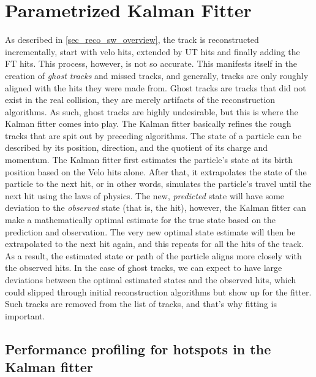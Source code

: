 \documentclass[12pt]{article}
\begin{document}
\section{Parametrized Kalman Fitter}

As described in \ref{sec_reco_sw_overview}, the track is reconstructed incrementally, start with velo hits, extended by UT hits and finally adding the FT hits. This process, however, is not so accurate. This manifests itself in the creation of \textit{ghost tracks} and missed tracks, and generally, tracks are only roughly aligned with the hits they were made from. Ghost tracks are tracks that did not exist in the real collision, they are merely artifacts of the reconstruction algorithms. As such, ghost tracks are highly undesirable, but this is where the Kalman fitter comes into play. 
The Kalman fitter basically refines the rough tracks that are spit out by preceding algorithms. The state of a particle can be described by its position, direction, and the quotient of its charge and momentum. The Kalman fitter first estimates the particle's state at its birth position based on the Velo hits alone. After that, it extrapolates the state of the particle to the next hit, or in other words, simulates the particle's travel until the next hit using the laws of physics. The new, \textit{predicted} state will have some deviation to the \textit{observed} state (that is, the hit), however, the Kalman fitter can make a mathematically optimal estimate for the true state based on the prediction and observation. The very new optimal state estimate will then be extrapolated to the next hit again, and this repeats for all the hits of the track.
As a result, the estimated state or path of the particle aligns more closely with the observed hits. In the case of ghost tracks, we can expect to have large deviations between the optimal estimated states and the observed hits, which could slipped through initial reconstruction algorithms but show up for the fitter. Such tracks are removed from the list of tracks, and that's why fitting is important.

\subsection{Performance profiling for hotspots in the Kalman fitter}
\end{document}
